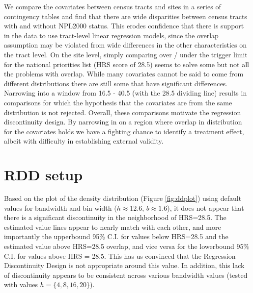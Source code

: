 \documentclass[letterpaper, 12pt]{article}
\begin{document}
We compare the covariates between census tracts and sites in a series of contingency tables and find that there are wide disparities between census tracts with and without NPL2000 status.  This erodes confidence that there is support in the data to use tract-level linear regression models, since the overlap assumption may be violated from wide differences in the other characteristics on the tract level.  On the site level, simply comparing over / under the trigger limit for the national priorities list (HRS score of 28.5) seems to solve some but not all the problems with overlap.  While many covariates cannot be said to come from different distributions there are still some that have significant differences.  Narrowing into a window from 16.5 - 40.5 (with the 28.5 dividing line) results in comparisons for which the hypothesis that the covariates are from the same distribution is not rejected.  Overall, these comparisons motivate the regression discontinuity design.  By narrowing in on a region where overlap in distribution for the covariates holds we have a fighting chance to identify a treatment effect, albeit with difficulty in establishing external validity.  





\section{RDD setup}
Based on the plot of the density distribution (Figure \ref{fig:ddplot}) using default values for bandwidth and bin width ($h \approx 12.6$, $b \approx 1.6$), it does not appear that there is a significant discontinuity in the neighborhood of HRS=28.5. The estimated value lines appear to nearly match with each other, and more importantly the upperbound 95\% C.I. for values below HRS=28.5 and the estimated value above HRS=28.5 overlap, and vice versa for the lowerbound 95\% C.I. for values above HRS = 28.5. This has us convinced that the Regression Discontinuity Design is not appropriate around this value. In addition, this lack of discontinuity appears to be consistent across various bandwidth values (tested with values $h = \{4, 8, 16, 20\}$).
\end{document}
